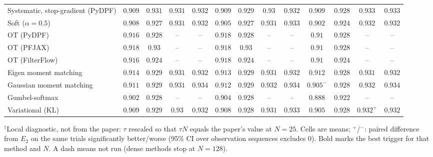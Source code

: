 \begin{table}[ht]
\begin{adjustbox}{max width=\linewidth}
\begin{tabular}{lcccc|cccc|cccc}
Systematic, stop-gradient (PyDPF) & $\mathbf{0.909}$ & $\mathbf{0.931}$ & $0.931$ & $0.932$ & $0.909$ & $0.929$ & $0.93$ & $0.932$ & $0.909$ & $0.928$ & $\mathbf{0.933}$ & $\mathbf{0.933}$ \\
Soft ($\alpha{=}0.5$) & $\mathbf{0.908}$ & $\mathbf{0.927}$ & $0.931$ & $0.932$ & $0.905$ & $0.927$ & $0.931$ & $\mathbf{0.933}$ & $0.902$ & $0.924$ & $\mathbf{0.932}$ & $0.932$ \\
OT (PyDPF) & $0.916$ & $\mathbf{0.928}$ & -- & -- & $\mathbf{0.918}$ & $\mathbf{0.928}$ & -- & -- & $0.91$ & $\mathbf{0.928}$ & -- & -- \\
OT (PFJAX) & $\mathbf{0.918}$ & $\mathbf{0.93}$ & -- & -- & $\mathbf{0.918}$ & $\mathbf{0.93}$ & -- & -- & $0.91$ & $0.928$ & -- & -- \\
OT (FilterFlow) & $0.916$ & $\mathbf{0.924}$ & -- & -- & $\mathbf{0.918}$ & $\mathbf{0.924}$ & -- & -- & $0.91$ & $\mathbf{0.924}$ & -- & -- \\
Eigen moment matching & $\mathbf{0.914}$ & $0.929$ & $\mathbf{0.931}$ & $\mathbf{0.932}$ & $0.913$ & $\mathbf{0.929}$ & $0.931$ & $\mathbf{0.932}$ & $0.912$ & $0.928$ & $0.931$ & $0.932$ \\
Gaussian moment matching & $0.911$ & $\mathbf{0.929}$ & $0.931$ & $0.934$ & $\mathbf{0.912}$ & $0.929$ & $0.932$ & $\mathbf{0.934}$ & $0.905^{-}$ & $0.928$ & $\mathbf{0.932}$ & $\mathbf{0.934}$ \\
Gumbel-softmax & $0.902$ & $\mathbf{0.928}$ & -- & -- & $\mathbf{0.904}$ & $\mathbf{0.928}$ & -- & -- & $0.888$ & $0.922$ & -- & -- \\
Variational (KL) & $\mathbf{0.909}$ & $\mathbf{0.929}$ & $0.93$ & $0.932$ & $0.908$ & $0.928$ & $0.931$ & $\mathbf{0.933}$ & $0.905$ & $0.928$ & $\mathbf{0.932}^{+}$ & $0.932$ \\
\bottomrule
\end{tabular}
\end{adjustbox}
\par\smallskip\parbox{0.95\linewidth}{\footnotesize $^\dagger$Local diagnostic, not from the paper: $\tau$ rescaled so that $\tau N$ equals the paper's value at $N{=}25$. Cells are means; $^{+}$/$^{-}$: paired difference from $E_2$ on the same trials significantly better/worse (95\% CI over observation sequences excludes 0). Bold marks the best trigger for that method and $N$. A dash means not run (dense methods stop at $N{=}128$).}
\end{table}

